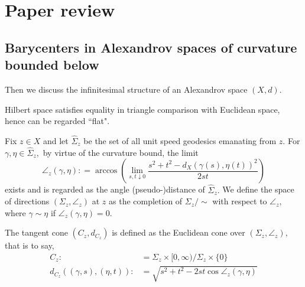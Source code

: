 \chapter{Paper review}
\section{Barycenters in Alexandrov spaces of curvature bounded below}
Then we discuss the infinitesimal structure of an Alexandrov space \( ( X , d )\).

\begin{rmk}[Example 2.1 c]
	Hilbert space satisfies equality in triangle comparison with Euclidean space, hence can be regarded ``flat".
\end{rmk}
\begin{defn}
	Fix \( z \in X \) and let \( \hat { \Sigma } _ { z } \) be the set of all unit speed geodesics emanating from \( z \). For \( \gamma , \eta \in \hat { \Sigma } _ { z } , \) by virtue of the curvature bound, the limit
	\begin{equation}
		\label{angle_def}
		\angle _ { z } ( \gamma , \eta ): = \arccos \left( \lim _ { s , t \downarrow 0 } \frac { s ^ { 2 } + t ^ { 2 } - d _ { X }\left( \gamma ( s ) , \eta ( t ) \right) ^ { 2 } } { 2 s t } \right)
	\end{equation}
	exists and is regarded as the angle (pseudo-)distance of \( \hat { \Sigma } _ { z } . \) We define the space of directions \( \left( \Sigma _ { z } , \angle _ { z } \right) \) at \( z \) as the completion of \( \Sigma _ { z } / \sim \) with respect to \( \angle _ { z } , \) where \( \gamma \sim \eta \) if \( \angle _ { z } ( \gamma , \eta ) = 0 . \)
\end{defn}

\begin{defn}
	The tangent cone \( \left( C _ { z } , d _ { C _ { z } } \right) \) is defined as the Euclidean cone over \( \left( \Sigma _ { z } , \angle _ { z } \right) , \)
	that is to say,
	\begin{align*}
		C _ { z }:                                           & = \Sigma _ { z } \times [ 0 , \infty ) / \Sigma _ { z } \times \{ 0 \}          \\
		d _ { C _ { z } } ( ( \gamma , s ) , ( \eta , t ) ): & = \sqrt { s ^ { 2 } + t ^ { 2 } - 2 s t \cos \angle _ { z } ( \gamma , \eta ) }
	\end{align*}
\end{defn}

